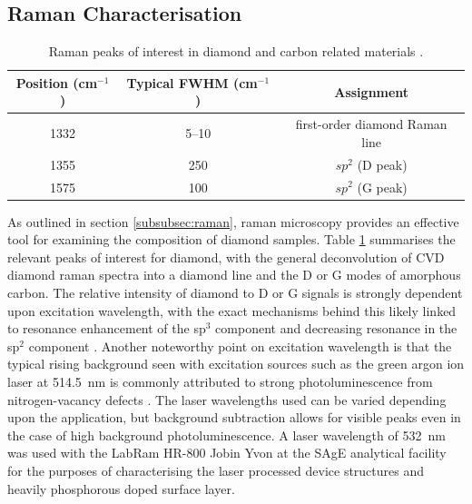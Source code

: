 \begin{refsection}
\subsection{Raman Characterisation}
\label{subsec:raman_characterisation}
\begin{table}[ht]
\centering
\begin{tabular}{ccc}
\hline
Position (cm$^{-1}$) & Typical FWHM (cm$^{-1}$) & Assignment \\ \hline
1332                 & 5--10                    & first-order diamond Raman line \\
1355                 & 250                      & $sp^2$ (D peak) \\
1575                 & 100                      & $sp^2$ (G peak) \\ \hline
\end{tabular}
\caption{Raman peaks of interest in diamond and carbon related materials \cite{prawer2004, Tuinstra1970}.}
\label{tab:raman_peaks}
\end{table}

As outlined in section \ref{subsubsec:raman}, raman microscopy provides an effective tool for examining the composition of diamond samples. Table \ref{tab:raman_peaks} summarises the relevant peaks of interest for diamond, with the general deconvolution of CVD diamond raman spectra into a diamond line and the D or G modes of amorphous carbon. The relative intensity of diamond to D or G signals is strongly dependent upon excitation wavelength, with the exact mechanisms behind this likely linked to resonance enhancement of the sp$^{3}$ component and decreasing resonance in the sp$^{2}$ component \cite{prawer2004}. Another noteworthy point on excitation wavelength is that the typical rising background seen with excitation sources such as the green argon ion laser at 514.5~\si{\nano\metre} is commonly attributed to strong photoluminescence from nitrogen-vacancy defects \cite{Filik2005}. The laser wavelengths used can be varied depending upon the application, but background subtraction allows for visible peaks even in the case of high background photoluminescence. A laser wavelength of 532~\si{\nano\metre} was used with the LabRam HR-800 Jobin Yvon at the SAgE analytical facility for the purposes of characterising the laser processed device structures and heavily phosphorous doped surface layer. 


\end{refsection}

